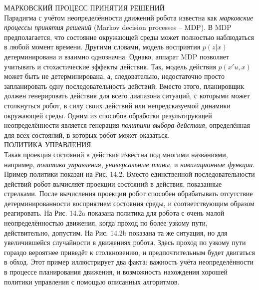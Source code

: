 \documentclass[10pt,a4paper]{article}
\begin{document}
МАРКОВСКИЙ ПРОЦЕСС ПРИНЯТИЯ РЕШЕНИЙ\\

Парадигма с учётом неопределённости движений робота известна как \textit{марковские процессы принятия решений} (Markov decision processes – MDP). В MDP предполагается, что состояние окружающей среды может полностью наблюдаться в любой момент времени. Другими словами, модель восприятия $p(z|x)$ детерминирована и взаимно однозначна. Однако, аппарат MDP позволяет учитывать и стохастические эффекты действия. Так, модель действия $p(x'u,x)$ может быть не детерминирована, а, следовательно, недостаточно просто запланировать одну последовательность действий. Вместо этого, планировщик должен генерировать действия для всего диапазона ситуаций, с которыми может столкнуться робот, в силу своих действий или непредсказуемой динамики окружающей среды. Одним из способов обработки результирующей неопределённости является генерация \textit{политики выбора действия}, определённая для всех состояний, в которых робот может оказаться.\\ 

ПОЛИТИКА УПРАВЛЕНИЯ\\
Такая проекция состояний в действия известна под многими названиями, например, \textit{политика управления}, \textit{универсальные планы}, и \textit{навигационные функции}. Пример политики показан на Рис. 14.2. Вместо единственной последовательности действий робот вычисляет проекции состояний в действия, показанные стрелками. После вычисления проекции робот способен обрабатывать отсутствие детерминированности восприятием состояния среды, и соответствующим образом реагировать. На Рис. 14.2a показана политика для робота с очень малой неопределённостью движения, когда проход по более узкому пути, действительно, допустим. На Рис. 14.2b показана та же ситуация, но для увеличившейся случайности в движениях робота. Здесь проход по узкому пути гораздо вероятнее приведёт к столкновению, и предпочтительным будет двигаться в обход. Этот пример иллюстрирует два факта: важность учёта неопределённости в процессе планирования движения, и возможность нахождения хорошей политики управления с помощью описанных алгоритмов.
\end{document}
